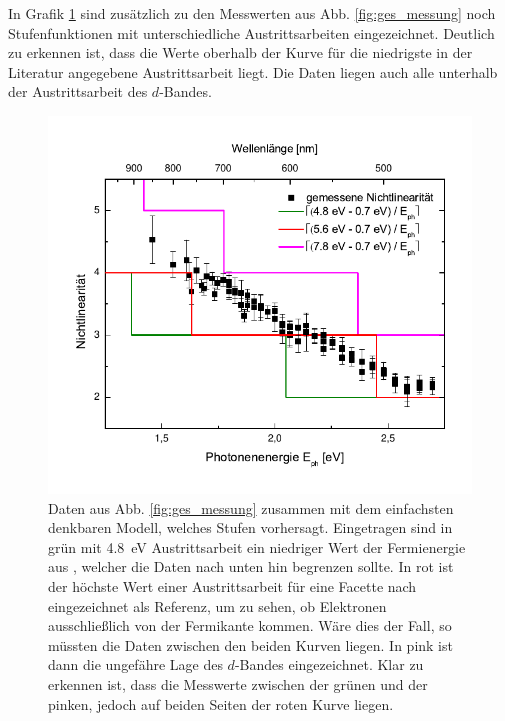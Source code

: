 \documentclass[bachelor,       %
               twoside,        %
               BCOR10mm,       %
               english,ngerman, %
               final,          %
               ]{GAUBM}
\begin{document}
In Grafik \ref{fig:stufen} sind zusätzlich zu den Messwerten aus Abb. \ref{fig:ges_messung} noch Stufenfunktionen mit unterschiedliche Austrittsarbeiten eingezeichnet.
Deutlich zu erkennen ist, dass die Werte oberhalb der Kurve für die niedrigste in der Literatur angegebene Austrittsarbeit liegt.
Die Daten liegen auch alle unterhalb der Austrittsarbeit des $d$-Bandes.

\begin{figure}[h!]
	\centering
	\includegraphics{Stufen}
	\caption{Daten aus Abb. \ref{fig:ges_messung} zusammen mit dem einfachsten denkbaren Modell, welches Stufen vorhersagt. Eingetragen sind in grün mit \SI{4.8}{\eV} Austrittsarbeit ein niedriger Wert der Fermienergie aus \cite{trasatti_operative_1974}, welcher die Daten nach unten hin begrenzen sollte. In rot ist der höchste Wert einer Austrittsarbeit für eine Facette nach \cite{crc} eingezeichnet als Referenz, um zu sehen, ob Elektronen ausschließlich von der Fermikante kommen. Wäre dies der Fall, so müssten die Daten zwischen den beiden Kurven liegen. In pink ist dann die ungefähre Lage des $d$-Bandes eingezeichnet. Klar zu erkennen ist, dass die Messwerte zwischen der grünen und der pinken, jedoch auf beiden Seiten der roten Kurve liegen.}
	\label{fig:stufen}
\end{figure}
\end{document}
